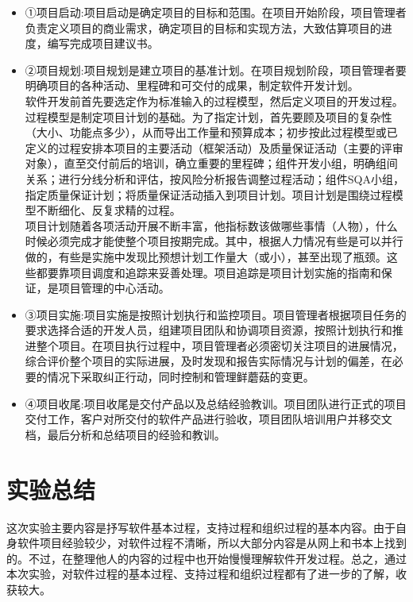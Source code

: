 \documentclass[UTF8,nofonts]{ctexart}
\begin{document}
\begin{itemize}
 \setlength{\itemsep}{0pt}
 \setlength{\parskip}{0pt}
 \setlength{\parsep}{0pt}
\item ①项目启动:项目启动是确定项目的目标和范围。在项目开始阶段，项目管理者负责定义项目的商业需求，确定项目的目标和实现方法，大致估算项目的进度，编写完成项目建议书。
\item	②项目规划:项目规划是建立项目的基准计划。在项目规划阶段，项目管理者要明确项目的各种活动、里程碑和可交付的成果，制定软件开发计划。\\
软件开发前首先要选定作为标准输入的过程模型，然后定义项目的开发过程。过程模型是制定项目计划的基础。为了指定计划，首先要顾及项目的复杂性（大小、功能点多少），从而导出工作量和预算成本；初步按此过程模型或已定义的过程安排本项目的主要活动（框架活动）及质量保证活动（主要的评审对象），直至交付前后的培训，确立重要的里程碑；组件开发小组，明确组间关系；进行分线分析和评估，按风险分析报告调整过程活动；组件SQA小组，指定质量保证计划；将质量保证活动插入到项目计划。项目计划是围绕过程模型不断细化、反复求精的过程。\\项目计划随着各项活动开展不断丰富，他指标数该做哪些事情（人物），什么时候必须完成才能使整个项目按期完成。其中，根据人力情况有些是可以并行做的，有些是实施中发现比预想计划工作量大（或小），甚至出现了瓶颈。这些都要靠项目调度和追踪来妥善处理。项目追踪是项目计划实施的指南和保证，是项目管理的中心活动。
\item	③项目实施:项目实施是按照计划执行和监控项目。项目管理者根据项目任务的要求选择合适的开发人员，组建项目团队和协调项目资源，按照计划执行和推进整个项目。在项目执行过程中，项目管理者必须密切关注项目的进展情况，综合评价整个项目的实际进展，及时发现和报告实际情况与计划的偏差，在必要的情况下采取纠正行动，同时控制和管理鲜蘑菇的变更。
\item	④项目收尾:项目收尾是交付产品以及总结经验教训。项目团队进行正式的项目交付工作，客户对所交付的软件产品进行验收，项目团队培训用户并移交文档，最后分析和总结项目的经验和教训。
\end{itemize}
\part{实验总结}
这次实验主要内容是抒写软件基本过程，支持过程和组织过程的基本内容。由于自身软件项目经验较少，对软件过程不清晰，所以大部分内容是从网上和书本上找到的。不过，在整理他人的内容的过程中也开始慢慢理解软件开发过程。总之，通过本次实验，对软件过程的基本过程、支持过程和组织过程都有了进一步的了解，收获较大。
\end{document}
